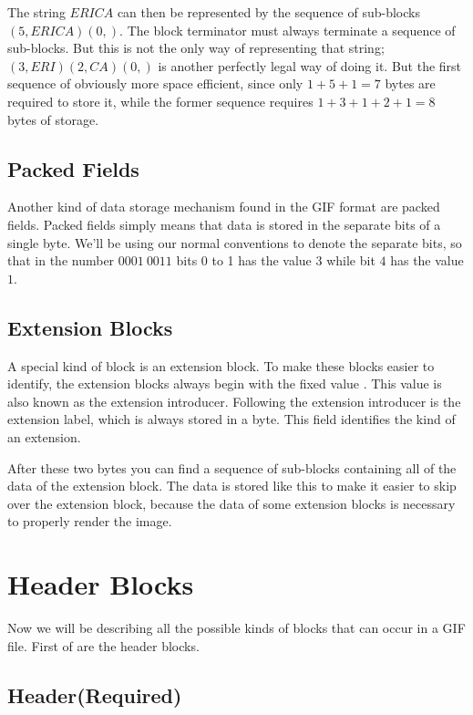 The string $ERICA$ can then be represented by the sequence of
sub-blocks $(5,ERICA)(0,)$. The block terminator must always terminate
a sequence of sub-blocks. But this is not the only way of representing
that string; $(3,ERI)(2,CA)(0,)$ is another perfectly legal way of
doing it. But the first sequence of obviously more space efficient,
since only $1 + 5 + 1 = 7$ bytes are required to store it, while the
former sequence requires $1 + 3 + 1 + 2 + 1 = 8$ bytes of storage.

\subsection{Packed Fields}

Another kind of data storage mechanism found in the GIF format are
packed fields. Packed fields simply means that data is stored in the
separate bits of a single byte. We'll be using our normal conventions
to denote the separate bits, so that in the number $0001\ 0011$ bits 0
to 1 has the value $3$ while bit $4$ has the value $1$.

\subsection{Extension Blocks}

A special kind of block is an extension block. To make these blocks
easier to identify, the extension blocks always begin with the fixed
value . This value is also known as the extension
introducer. Following the extension
introducer is the extension label, which is always stored in a
byte. This field identifies the kind of an extension.

After these two bytes you can find a sequence of sub-blocks containing
all of the data of the extension block. The data is stored like this
to make it easier to skip over the extension block, because the data
of some extension blocks is necessary to properly render the image.

\section{Header Blocks}

Now we will be describing all the possible kinds of blocks that can
occur in a GIF file. First of are the header blocks.

\subsection{Header(Required)}

